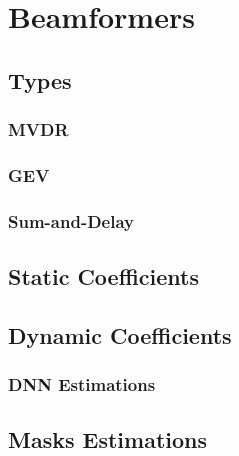 \chapter{Beamformers}
\section{Types}

\subsection{MVDR}
\subsection{GEV}
\subsection{Sum-and-Delay}

\section{Static Coefficients}

\section{Dynamic Coefficients}
\subsection{DNN Estimations}
\section{Masks Estimations}